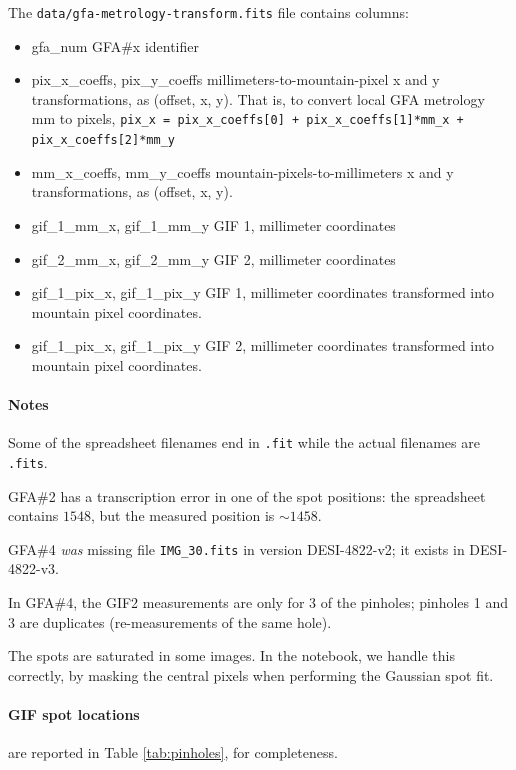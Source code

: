 \documentclass[10pt]{article}
\newcommand{\code}[1]{\texttt{#1}}
\begin{document}
The \code{data/gfa-metrology-transform.fits} file contains columns:
\begin{itemize}
\item{gfa\_num} GFA\#x identifier
\item{pix\_x\_coeffs, pix\_y\_coeffs} millimeters-to-mountain-pixel x and y transformations, as (offset, x, y).
  That is, to convert local GFA metrology mm to pixels, \code{pix\_x = pix\_x\_coeffs[0] + pix\_x\_coeffs[1]*mm\_x + pix\_x\_coeffs[2]*mm\_y}
\item{mm\_x\_coeffs, mm\_y\_coeffs} mountain-pixels-to-millimeters x and y transformations, as (offset, x, y).
\item{gif\_1\_mm\_x, gif\_1\_mm\_y} GIF 1, millimeter coordinates
\item{gif\_2\_mm\_x, gif\_2\_mm\_y} GIF 2, millimeter coordinates
\item{gif\_1\_pix\_x, gif\_1\_pix\_y} GIF 1, millimeter coordinates transformed
  into mountain pixel coordinates.
\item{gif\_1\_pix\_x, gif\_1\_pix\_y} GIF 2, millimeter coordinates transformed
  into mountain pixel coordinates.
\end{itemize}


\paragraph{Notes}

Some of the spreadsheet filenames end in \code{.fit} while the actual
filenames are \code{.fits}.

GFA\#2 has a transcription error in one of the spot positions: the
spreadsheet contains $1548$, but the measured position is $\sim 1458$.

GFA\#4 \emph{was} missing file \code{IMG\_30.fits} in version
DESI-4822-v2; it exists in DESI-4822-v3.

In GFA\#4, the GIF2 measurements are only for 3 of the pinholes;
pinholes 1 and 3 are duplicates (re-measurements of the same hole).

The spots are saturated in some images.  In the notebook, we handle this correctly, by masking the central pixels
when performing the Gaussian spot fit.


\paragraph{GIF spot locations} are reported in Table \ref{tab:pinholes},
for completeness.
\end{document}
